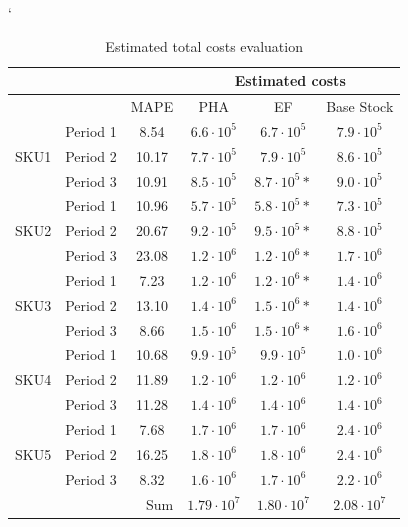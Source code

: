 \documentclass[11pt,a4paper]{article}
\begin{document}
\begin{table} \catcode`
\centering
\begin{tabular}{|c|c|c|c|c|c|}
\hline
\multicolumn{3}{|c|}{} &\multicolumn{3}{|c|}{Estimated costs} \\ \hline
\multicolumn{2}{|c|}{}& MAPE &  PHA & EF & Base Stock \\ \hline
\multirow{ 3}{*}{SKU1}& Period 1 & 8.54 & \boldmath $6.6\cdot 10^5 $\unboldmath  & $6.7\cdot 10^5 $ & $7.9\cdot 10^5 $\\  \cline{2-6}
& Period 2 & 10.17 &  \boldmath $7.7\cdot 10^5 $\unboldmath & $7.9\cdot 10^5 $ & $8.6\cdot 10^5 $\\  \cline{2-6}
& Period 3 & 10.91 & \boldmath$8.5\cdot 10^5 $\unboldmath  & $8.7\cdot 10^5 *$ & $9.0\cdot 10^5 $\\ \hline 
\multirow{ 3}{*}{SKU2}& Period 1 & 10.96 & \boldmath$5.7\cdot 10^5 $\unboldmath  & $5.8\cdot 10^5 *$ & $7.3\cdot 10^5 $\\  \cline{2-6}
& Period 2 & 20.67 & $9.2\cdot 10^5 $ & $9.5\cdot 10^5 *$ & \boldmath $8.8\cdot 10^5 $\unboldmath \\  \cline{2-6}
& Period 3 & 23.08 & \boldmath$1.2\cdot 10^6 $\unboldmath  & $1.2\cdot 10^6 *$ & $1.7\cdot 10^6 $\\ \hline 
\multirow{ 3}{*}{SKU3}& Period 1 & 7.23 & \boldmath$1.2\cdot 10^6 $\unboldmath  & $1.2\cdot 10^6 *$ & $1.4\cdot 10^6 $\\  \cline{2-6}
& Period 2 & 13.10 & \boldmath $1.4\cdot 10^6 $\unboldmath  & $1.5\cdot 10^6 *$ & $1.4\cdot 10^6 $\\  \cline{2-6}
& Period 3 & 8.66 & \boldmath $1.5\cdot 10^6 $ \unboldmath & $1.5\cdot 10^6 *$ & $1.6\cdot 10^6 $\\ \hline 
\multirow{ 3}{*}{SKU4}& Period 1 & 10.68 & \boldmath $9.9\cdot 10^5 $\unboldmath  & $9.9\cdot 10^5 $ & $1.0\cdot 10^6 $\\  \cline{2-6}
& Period 2 & 11.89 & \boldmath $1.2\cdot 10^6 $\unboldmath  & $1.2\cdot 10^6 $ & $1.2\cdot 10^6 $\\  \cline{2-6}
& Period 3 & 11.28 & \boldmath $1.4\cdot 10^6 $\unboldmath  & $1.4\cdot 10^6 $ & $1.4\cdot 10^6 $\\ \hline 
\multirow{ 3}{*}{SKU5}& Period 1 & 7.68 & \boldmath $1.7\cdot 10^6 $\unboldmath  & $1.7\cdot 10^6 $ & $2.4\cdot 10^6 $\\  \cline{2-6}
& Period 2 & 16.25 & $1.8\cdot 10^6 $ & \boldmath $1.8\cdot 10^6 $\unboldmath  & $2.4\cdot 10^6 $\\  \cline{2-6}
& Period 3 & 8.32 & \boldmath $1.6\cdot 10^6 $\unboldmath  & $1.7\cdot 10^6 $ & $2.2\cdot 10^6 $\\ \hline 
 \multicolumn{3}{|r|}{Sum }& \boldmath $1.79\cdot 10^7$\unboldmath  & $1.80\cdot 10^7$ & $2.08\cdot 10^7$\\ \hline 
\end{tabular}
\caption{Estimated total costs evaluation}
\label{tbl:costs}
\end{table}
\end{document}
